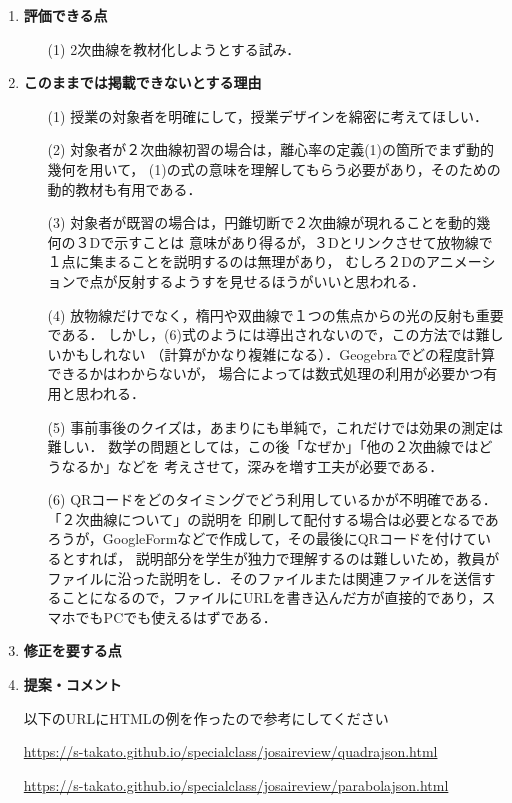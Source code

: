 \documentclass[11pt]{jarticle}
\begin{document}
\begin{enumerate}
\item%
{\bf 評価できる点}
\begin{enumerate}
\item[(1)]%
2次曲線を教材化しようとする試み．
\end{enumerate}

\item%
{\bf このままでは掲載できないとする理由}
\begin{enumerate}
\item[(1)]%
授業の対象者を明確にして，授業デザインを綿密に考えてほしい．
\item[(2)]%
対象者が２次曲線初習の場合は，離心率の定義(1)の箇所でまず動的幾何を用いて，
(1)の式の意味を理解してもらう必要があり，そのための動的教材も有用である．

\item[(3)]%
対象者が既習の場合は，円錐切断で２次曲線が現れることを動的幾何の３Dで示すことは
意味があり得るが，３Dとリンクさせて放物線で１点に集まることを説明するのは無理があり，
むしろ２Dのアニメーションで点が反射するようすを見せるほうがいいと思われる．
\item[(4)]%
放物線だけでなく，楕円や双曲線で１つの焦点からの光の反射も重要である．
しかし，(6)式のようには導出されないので，この方法では難しいかもしれない
（計算がかなり複雑になる）．Geogebraでどの程度計算できるかはわからないが，
場合によっては数式処理の利用が必要かつ有用と思われる．
\item[(5)]%
事前事後のクイズは，あまりにも単純で，これだけでは効果の測定は難しい．
数学の問題としては，この後「なぜか」「他の２次曲線ではどうなるか」などを
考えさせて，深みを増す工夫が必要である．
\item[(6)]%
QRコードをどのタイミングでどう利用しているかが不明確である．「２次曲線について」の説明を
印刷して配付する場合は必要となるであろうが，GoogleFormなどで作成して，その最後にQRコードを付けているとすれば，
説明部分を学生が独力で理解するのは難しいため，教員がファイルに沿った説明をし．そのファイルまたは関連ファイルを送信することになるので，ファイルにURLを書き込んだ方が直接的であり，スマホでもPCでも使えるはずである．

\end{enumerate}

\item%
{\bf 修正を要する点}


\item%
{\bf 提案・コメント}

以下のURLにHTMLの例を作ったので参考にしてください

{\small
\url{https://s-takato.github.io/specialclass/josaireview/quadrajson.html}
}

{\small
\url{https://s-takato.github.io/specialclass/josaireview/parabolajson.html}
}


\end{enumerate}
\end{document}

